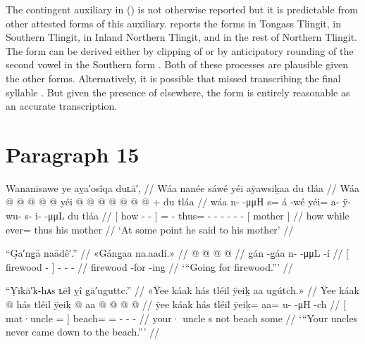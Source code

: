 The contingent auxiliary  in (\lastx) is not otherwise reported but it is predictable from other attested forms of this auxiliary.
\textcite[155–156]{leer:1991} reports the forms  in Tongass Tlingit,  in Southern Tlingit,  in Inland Northern Tlingit, and  in the rest of Northern Tlingit.
The form  can be derived either by clipping of  or by anticipatory rounding of the second vowel in the Southern form .
Both of these processes are plausible given the other forms.
Alternatively, it is possible that \citeauthor{swanton:1909} missed transcribing the final syllable .
But given the presence of  elsewhere, the form  is entirely reasonable as an accurate transcription.

\section{Paragraph 15}\label{sec:91-para-15}

\ex\label{ex:91-163-}%
%
\begingl
	\glpreamble	Wananīsawe ye aỵa′osîqa duʟā′, //
	\glpreamble	Wáa nanée sáwé yéi aÿawsiḵaa du tláa //
	\gla	{} Wáa  @ {} @ {} @ {} {}
		 @ {} @ {}
		yéi @  @ {} @ {} @ {} @ {} @ {} @ {} +
		{} du tláa {} //
	\glb	{} wáa n-  -μμH {} {} 
		s= á -wé
		yéi= a- ÿ- wu- s- i-  -μμL
		{} du tláa {} //
	\glc	{}[ how -  - \· {}]
		=  -
		thus= - - - - -  -
		{}[  mother {}] //
	\gld	{} how  {} {} \·while {}
		ever=  {}
		thus\•  {} {} {} {} {} {}
		{} his mother {} //
	\glft	‘At some point he said to his mother’
		//
\endgl
\xe

\ex\label{ex:91-164-going-for-firewood}%
%
\begingl
	\glpreamble	“G̣a′ng̣ā naādê′.” //
	\glpreamble	«\!Gáng̱aa na.aadí.\!» //
	\gla	{}  @ {} {}
		 @ {} @ {} @ {}  //
	\glb	{} gán -g̱áa {}
		n-  -μμL -í //
	\glc	{}[ firewood - {}]
		-  - - //
	\gld	{} firewood -for {}
		 {} {} -ing //
	\glft	‘“Going for firewood.”’
		//
\endgl
\xe

\ex\label{ex:91-165-your-uncles-never-come-beach}%
%
\begingl
	\glpreamble	“Ỵīkā′k-hᴀs ʟēł ỵî g̣ā′uguttc.” //
	\glpreamble	«\!Ÿee káak hás tléil ÿeiḵ aa ugútch.\!» //
	\gla	{} Ÿee káak @ \•hás {}
		tléil ÿeiḵ @ aa @  @ {} @ {} @ {} //
	\glb	{} ÿee káak \•hás {}
		tléil ÿeiḵ= aa= u-  -μH -ch //
	\glc	{}[  mat·uncle = {}]
		 beach= = -  - - //
	\gld	{} your· uncle \•s {}
		not beach\• some\•  //
	\glft	‘“Your uncles never came down to the beach.”’
		//
\endgl
\xe

